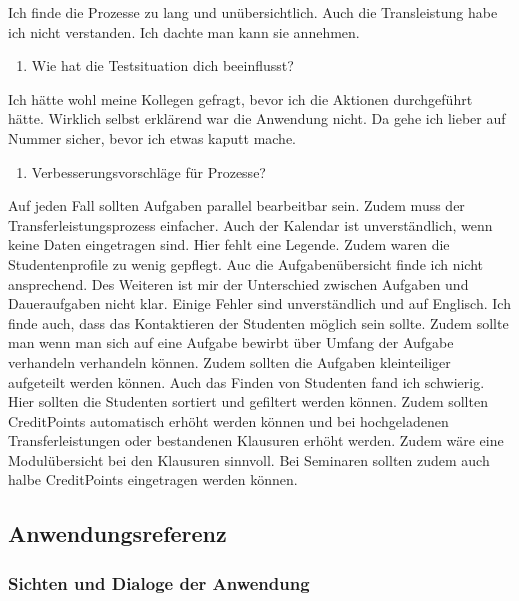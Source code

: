 \documentclass[
  12pt,
  ngerman,
  a4paper,
]{article}
\providecommand{\tightlist}{%
  \setlength{\itemsep}{0pt}\setlength{\parskip}{0pt}}
\begin{document}
Ich finde die Prozesse zu lang und unübersichtlich. Auch die
Transleistung habe ich nicht verstanden. Ich dachte man kann sie
annehmen.

\begin{enumerate}
\def\labelenumi{\arabic{enumi}.}
\setcounter{enumi}{3}
\tightlist
\item
  Wie hat die Testsituation dich beeinflusst?
\end{enumerate}

Ich hätte wohl meine Kollegen gefragt, bevor ich die Aktionen
durchgeführt hätte. Wirklich selbst erklärend war die Anwendung nicht.
Da gehe ich lieber auf Nummer sicher, bevor ich etwas kaputt mache.

\begin{enumerate}
\def\labelenumi{\arabic{enumi}.}
\setcounter{enumi}{4}
\tightlist
\item
  Verbesserungsvorschläge für Prozesse?
\end{enumerate}

Auf jeden Fall sollten Aufgaben parallel bearbeitbar sein. Zudem muss
der Transferleistungsprozess einfacher. Auch der Kalendar ist
unverständlich, wenn keine Daten eingetragen sind. Hier fehlt eine
Legende. Zudem waren die Studentenprofile zu wenig gepflegt. Auc die
Aufgabenübersicht finde ich nicht ansprechend. Des Weiteren ist mir der
Unterschied zwischen Aufgaben und Daueraufgaben nicht klar. Einige
Fehler sind unverständlich und auf Englisch. Ich finde auch, dass das
Kontaktieren der Studenten möglich sein sollte. Zudem sollte man wenn
man sich auf eine Aufgabe bewirbt über Umfang der Aufgabe verhandeln
verhandeln können. Zudem sollten die Aufgaben kleinteiliger aufgeteilt
werden können. Auch das Finden von Studenten fand ich schwierig. Hier
sollten die Studenten sortiert und gefiltert werden können. Zudem
sollten CreditPoints automatisch erhöht werden können und bei
hochgeladenen Transferleistungen oder bestandenen Klausuren erhöht
werden. Zudem wäre eine Modulübersicht bei den Klausuren sinnvoll. Bei
Seminaren sollten zudem auch halbe CreditPoints eingetragen werden
können.

\hypertarget{sec:appendix:screens}{%
\subsection{Anwendungsreferenz}\label{sec:appendix:screens}}

\hypertarget{sichten-und-dialoge-der-anwendung}{%
\subsubsection{Sichten und Dialoge der
Anwendung}\label{sichten-und-dialoge-der-anwendung}}
\end{document}
